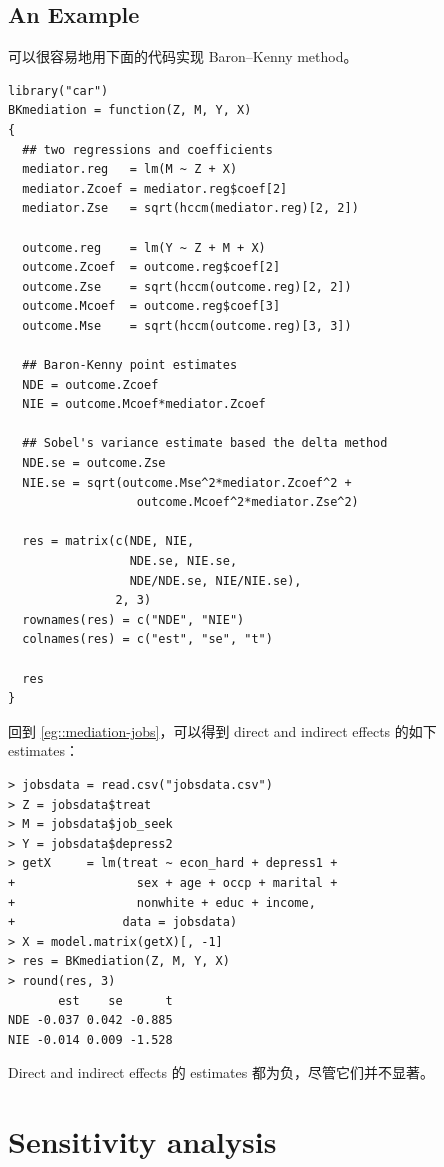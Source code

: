  


\subsection{An Example}\label{section::BK-jobs}

可以很容易地用下面的代码实现 Baron--Kenny method。

 \begin{lstlisting}
library("car")
BKmediation = function(Z, M, Y, X)
{
  ## two regressions and coefficients
  mediator.reg   = lm(M ~ Z + X)
  mediator.Zcoef = mediator.reg$coef[2]
  mediator.Zse   = sqrt(hccm(mediator.reg)[2, 2])
  
  outcome.reg    = lm(Y ~ Z + M + X)
  outcome.Zcoef  = outcome.reg$coef[2]
  outcome.Zse    = sqrt(hccm(outcome.reg)[2, 2])
  outcome.Mcoef  = outcome.reg$coef[3]
  outcome.Mse    = sqrt(hccm(outcome.reg)[3, 3])
  
  ## Baron-Kenny point estimates
  NDE = outcome.Zcoef
  NIE = outcome.Mcoef*mediator.Zcoef
  
  ## Sobel's variance estimate based the delta method
  NDE.se = outcome.Zse
  NIE.se = sqrt(outcome.Mse^2*mediator.Zcoef^2 + 
                  outcome.Mcoef^2*mediator.Zse^2)
  
  res = matrix(c(NDE, NIE, 
                 NDE.se, NIE.se,
                 NDE/NDE.se, NIE/NIE.se), 
               2, 3)
  rownames(res) = c("NDE", "NIE")
  colnames(res) = c("est", "se", "t")
  
  res
}
 \end{lstlisting}
 
 
 回到 \cref{eg::mediation-jobs}，可以得到 direct and indirect effects 的如下 estimates：
 
 \begin{lstlisting}
> jobsdata = read.csv("jobsdata.csv")
> Z = jobsdata$treat
> M = jobsdata$job_seek
> Y = jobsdata$depress2
> getX     = lm(treat ~ econ_hard + depress1 + 
+                 sex + age + occp + marital + 
+                 nonwhite + educ + income,
+               data = jobsdata)
> X = model.matrix(getX)[, -1]
> res = BKmediation(Z, M, Y, X)
> round(res, 3)
       est    se      t
NDE -0.037 0.042 -0.885
NIE -0.014 0.009 -1.528
\end{lstlisting}

Direct and indirect effects 的 estimates 都为负，尽管它们并不显著。



\section{Sensitivity analysis}


